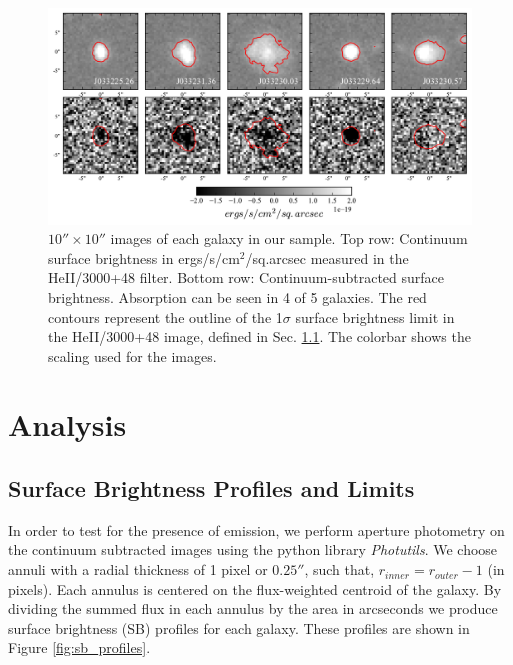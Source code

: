 \documentclass[twocolumn]{aastex61}
\begin{document}
\begin{figure}[!htb]
\centering
\includegraphics[scale=0.7]{../Figures/stamps.pdf}
\caption{ $10'' \times 10''$ images of each galaxy in our sample. Top row: Continuum surface brightness in ergs/s/cm$^2$/sq.arcsec measured in the HeII/3000+48 filter. Bottom row: Continuum-subtracted  surface brightness.  Absorption can be seen in 4 of 5 galaxies. The red contours represent the outline of the 1$\sigma$ surface brightness limit in the HeII/3000+48 image, defined in Sec. \ref{sec.sb}. The colorbar shows the scaling used for the  images.}
\label{fig:stamp_images}
\end{figure}

\section{Analysis} \label{sec:analysis}

\subsection{Surface Brightness Profiles and Limits}\label{sec.sb}

In order to test for the presence of  emission, we perform aperture photometry on the continuum subtracted images using the python library \emph{Photutils}. We choose annuli with a radial thickness of 1 pixel or $0.25 ''$, such that, $r_{inner}=r_{outer}-1$ (in pixels). Each annulus is centered on the flux-weighted centroid of the galaxy. By dividing the summed flux in each annulus by the area in arcseconds we produce surface brightness (SB) profiles for each galaxy. These profiles are shown in Figure \ref{fig:sb_profiles}. 
\end{document}
